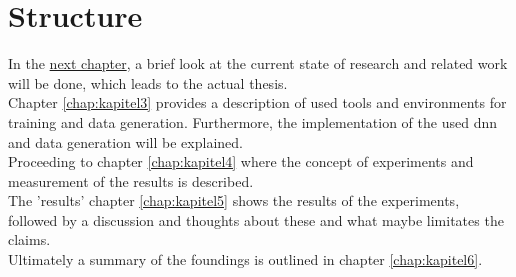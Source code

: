 	
	
	\section{Structure}
	\label{sec:structure}
		In the \hyperref[chap:kapitel2]{next chapter}, a brief look at the current state of research and related work will be done, which leads to the actual thesis.\\
		Chapter \ref{chap:kapitel3} provides a description of used tools and environments for training and data generation. Furthermore, the implementation of the used \ac{dnn} and data generation will be explained.\\
		Proceeding to chapter \ref{chap:kapitel4} where the concept of experiments and measurement of the results is described.\\
		The 'results' chapter \ref{chap:kapitel5} shows the results of the experiments, followed by a discussion and thoughts about these and what maybe limitates the claims.\\
		Ultimately a summary of the foundings is outlined in chapter \ref{chap:kapitel6}.
		






